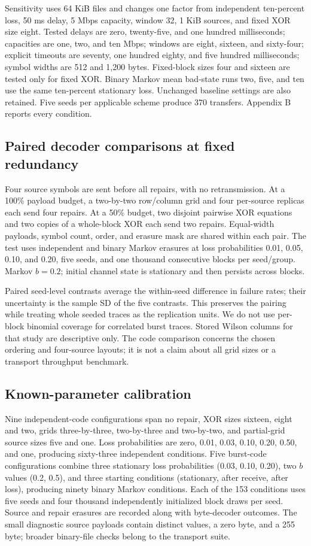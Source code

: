 \documentclass[11pt,a4paper]{article}
\begin{document}
Sensitivity uses 64 KiB files and changes one factor from independent ten-percent loss, 50 ms delay, 5 Mbps capacity, window 32, 1 KiB sources, and fixed XOR size eight. Tested delays are zero, twenty-five, and one hundred milliseconds; capacities are one, two, and ten Mbps; windows are eight, sixteen, and sixty-four; explicit timeouts are seventy, one hundred eighty, and five hundred milliseconds; symbol widths are 512 and 1,200 bytes. Fixed-block sizes four and sixteen are tested only for fixed XOR. Binary Markov mean bad-state runs two, five, and ten use the same ten-percent stationary loss. Unchanged baseline settings are also retained. Five seeds per applicable scheme produce 370 transfers. Appendix B reports every condition.

\subsection{Paired decoder comparisons at fixed redundancy}
Four source symbols are sent before all repairs, with no retransmission. At a 100\% payload budget, a two-by-two row/column grid and four per-source replicas each send four repairs. At a 50\% budget, two disjoint pairwise XOR equations and two copies of a whole-block XOR each send two repairs. Equal-width payloads, symbol count, order, and erasure mask are shared within each pair. The test uses independent and binary Markov erasures at loss probabilities 0.01, 0.05, 0.10, and 0.20, five seeds, and one thousand consecutive blocks per seed/group. Markov $b=0.2$; initial channel state is stationary and then persists across blocks.

Paired seed-level contrasts average the within-seed difference in failure rates; their uncertainty is the sample SD of the five contrasts. This preserves the pairing while treating whole seeded traces as the replication units. We do not use per-block binomial coverage for correlated burst traces. Stored Wilson columns for that study are descriptive only. The code comparison concerns the chosen ordering and four-source layouts; it is not a claim about all grid sizes or a transport throughput benchmark.

\subsection{Known-parameter calibration}
Nine independent-code configurations span no repair, XOR sizes sixteen, eight and two, grids three-by-three, two-by-three and two-by-two, and partial-grid source sizes five and one. Loss probabilities are zero, 0.01, 0.03, 0.10, 0.20, 0.50, and one, producing sixty-three independent conditions. Five burst-code configurations combine three stationary loss probabilities (0.03, 0.10, 0.20), two $b$ values (0.2, 0.5), and three starting conditions (stationary, after receive, after loss), producing ninety binary Markov conditions. Each of the 153 conditions uses five seeds and four thousand independently initialized block draws per seed. Source and repair erasures are recorded along with byte-decoder outcomes. The small diagnostic source payloads contain distinct values, a zero byte, and a 255 byte; broader binary-file checks belong to the transport suite.
\end{document}
